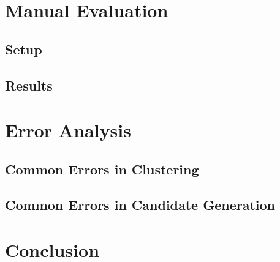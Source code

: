 \documentclass[a4paper,BCOR=10mm]{report}
\begin{document}
\chapter{Manual Evaluation}

\section{Setup}

\section{Results}

\chapter{Error Analysis}

\section{Common Errors in Clustering}

\section{Common Errors in Candidate Generation}


\chapter{Conclusion}
\end{document}
